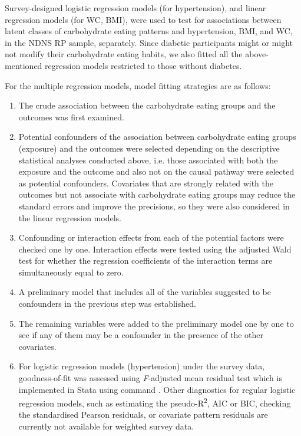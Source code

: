 

Survey-designed logistic regression models (for hypertension), and linear regression models (for WC, BMI), were used to test for associations between latent classes of carbohydrate eating patterns and hypertension, BMI, and WC, in the NDNS RP sample, separately. Since diabetic participants might or might not modify their carbohydrate eating habits, we also fitted all the above-mentioned regression models restricted to those without diabetes.

For the multiple regression models, model fitting strategies are as follows: 

\begin{enumerate}
	\item The crude association between the carbohydrate eating groups and the outcomes was first examined. 
	\item Potential confounders of the association between carbohydrate eating groups (exposure) and the outcomes were selected depending on the descriptive statistical analyses conducted above, i.e. those associated with both the exposure and the outcome and also not on the causal pathway were selected as potential confounders. Covariates that are strongly related with the outcomes but not associate with carbohydrate eating groups may reduce the standard errors and improve the precisions, so they were also considered in the linear regression models. 
	\item Confounding or interaction effects from each of the potential factors were checked one by one. Interaction effects were tested using the adjusted Wald test for whether the regression coefficients of the interaction terms are simultaneously equal to zero.  
	\item A preliminary model that includes all of the variables suggested to be confounders in the previous step was established. 
	\item The remaining variables were added to the preliminary model one by one to see if any of them may be a confounder in the presence of the other covariates. 
	\item For logistic regression models (hypertension) under the survey data, goodness-of-fit was assessed using \textit{F}-adjusted mean residual test \parencite{archer2001goodness,archer2007goodness} which is implemented in Stata using command  \parencite{archer2006goodness}. Other diagnostics for regular logistic regression models, such as estimating the pseudo-R\textsuperscript{2},  AIC or BIC, checking the standardised Pearson residuals, or covariate pattern residuals are currently not available for weighted survey data. 

\end{enumerate}
